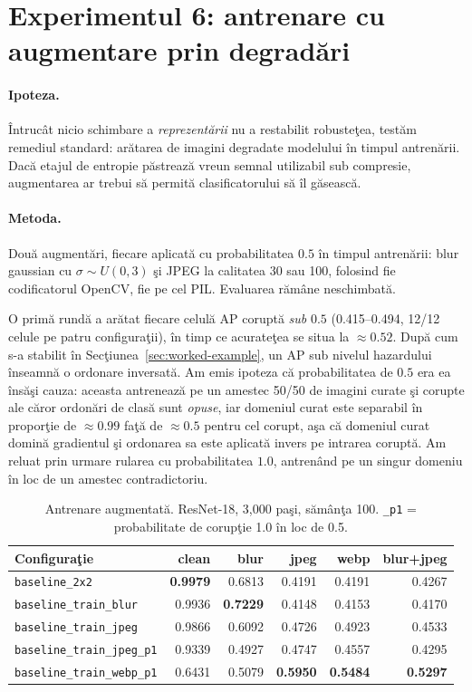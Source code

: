 \section{Experimentul 6: antrenare cu augmentare prin degradări}
\label{sec:exp-aug}

\paragraph{Ipoteza.} Întrucât nicio schimbare a \emph{reprezentării} nu a
restabilit robusteţea, testăm remediul standard: arătarea de imagini degradate
modelului în timpul antrenării. Dacă etajul de entropie păstrează vreun semnal
utilizabil sub compresie, augmentarea ar trebui să permită clasificatorului să
îl găsească.

\paragraph{Metoda.} Două augmentări, fiecare aplicată cu probabilitatea $0.5$ în
timpul antrenării: blur gaussian cu $\sigma \sim U(0,3)$ şi JPEG la calitatea 30
sau 100, folosind fie codificatorul OpenCV, fie pe cel PIL. Evaluarea rămâne
neschimbată.

O primă rundă a arătat fiecare celulă AP coruptă \emph{sub} $0.5$ (0.415--0.494,
12/12 celule pe patru configuraţii), în timp ce acurateţea se situa la
$\approx0.52$. După cum s-a stabilit în Secţiunea~\ref{sec:worked-example}, un AP
sub nivelul hazardului înseamnă o ordonare inversată. Am emis ipoteza că
probabilitatea de $0.5$ era ea însăşi cauza: aceasta antrenează pe un amestec
50/50 de imagini curate şi corupte ale căror ordonări de clasă sunt
\emph{opuse}, iar domeniul curat este separabil în proporţie de $\approx0.99$
faţă de $\approx0.5$ pentru cel corupt, aşa că domeniul curat domină gradientul
şi ordonarea sa este aplicată invers pe intrarea coruptă. Am reluat prin urmare
rularea cu probabilitatea $1.0$, antrenând pe un singur domeniu în loc de un
amestec contradictoriu.

\begin{table}[t]
  \centering
  \caption{Antrenare augmentată. ResNet-18, 3{,}000 paşi, sămânţa 100.
  \texttt{\_p1} = probabilitate de corupţie 1.0 în loc de 0.5.}
  \label{tab:aug}
  \begin{tabular}{lrrrrr}
    \toprule
    Configuraţie & clean & blur & jpeg & webp & blur+jpeg \\
    \midrule
    \texttt{baseline\_2x2}             & \textbf{0.9979} & 0.6813 & 0.4191 & 0.4191 & 0.4267 \\
    \texttt{baseline\_train\_blur}     & 0.9936 & \textbf{0.7229} & 0.4148 & 0.4153 & 0.4170 \\
    \texttt{baseline\_train\_jpeg}     & 0.9866 & 0.6092 & 0.4726 & 0.4923 & 0.4533 \\
    \texttt{baseline\_train\_jpeg\_p1} & 0.9339 & 0.4927 & 0.4747 & 0.4557 & 0.4295 \\
    \texttt{baseline\_train\_webp\_p1} & 0.6431 & 0.5079 & \textbf{0.5950} & \textbf{0.5484} & \textbf{0.5297} \\
    \bottomrule
  \end{tabular}
\end{table}

